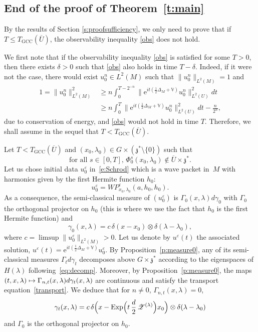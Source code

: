 \documentclass[JEP,XML,SOM,Unicode,published]{cedram}
\let\mathcal\mathscr
\newcommand\mto{\mathchoice{\longmapsto}{\mapsto}{\mapsto}{\mapsto}}
\newcommand{\rme}{\mathrm{e}}
\newcommand{\GCC}{\mathrm{GCC}}
\DeclareMathOperator{\Exp}{Exp}
\theoremstyle{plain}
\theoremstyle{definition}
\let\eps\varepsilon
\def\bbV{{\mathbb V}}
\begin{document}
\subsection{End of the proof of Theorem~\ref{t:main}} By the results of Section \ref{s:proofsufficiency}, we only need to prove that if $T\leq T_\GCC(\overline{U})$, the observability inequality \eqref{obs} does not hold.

We first note that if the observability inequality \eqref{obs} is satisfied for some $T>0$, then there exists $\delta>0$ such that \eqref{obs} also holds in time $T-\delta$. Indeed, if it were not the case, there would exist $u_0^n\in L^2(M)$ such that $\|u_0^n\|_{L^2(M)}=1$ and
\begin{align*}
1=\|u_0^n\|_{L^2(M)}^2&\geq n\int_0^{T-2^{-n}} \bigl\| \rme^{it(\frac12 \Delta_M+\bbV)} u_0^n\bigr\|^2_{L^2(U)} dt\\
&\geq n\int_0^{T} \bigl\| \rme^{it(\frac12 \Delta_M+\bbV)} u_0^n\bigr\|^2_{L^2(U)} dt-\frac{n}{2^n},
\end{align*}
due to conservation of energy, and \eqref{obs} would not hold in time $T$. Therefore, we shall assume in the sequel that $T<T_\GCC(\overline{U})$.

Let $T<T_\GCC(\overline{U})$ and $(x_0,\lambda_0)\in G\times (\mathfrak z^*\setminus\{0\})$ such that
\begin{equation}\label{e:hypfermee}
\text{for all $s\in [0,T]$, \ $\Phi_0^s(x_0,\lambda_0)\notin \overline{U}\times \mathfrak z^*$.}
\end{equation}
Let us chose initial data $u^\eps_0$ in~\eqref{e:Schrod} which is a wave packet in~$M$ with harmonics given by the first Hermite function $h_0$:
\[
u^\eps_0=WP^\eps_{x_0,\lambda_0}(a,h_0,h_0).
\]
As a consequence, the semi-classical measure of $(u^\eps_0)$ is $\Gamma_0(x,\lambda) d\gamma_0$ with $\Gamma_0$ the orthogonal projector on $h_0$ (this is where we use the fact that $h_0$ is the first Hermite function) and
\[
\gamma_0(x,\lambda)=c \, \delta(x-x_0)\otimes \delta(\lambda-\lambda_0),
\]
where $c=\limsup \| u^\eps_0\|_{L^2(M)}>0 $.
Let us denote by $u^\eps(t)$ the associated solution, $u^\eps(t)= \rme^{it(\frac12 \Delta_M+\bbV)} u^\eps_0$. By Proposition~\ref{p:measure0}, any of its semi-classical measures $\Gamma_t d\gamma_t$ decomposes above $G\times \mathfrak z^*$ according to the eigenspaces of $H(\lambda)$ following~\eqref{eq:decomp}.
Moreover, by Proposition~\ref{p:measure0},
the maps $(t,x,\lambda)\mto \Gamma_{n,t}(x,\lambda) d\gamma_t(x,\lambda)$ are continuous and satisfy the transport equation~\eqref{transport}.
We deduce that for $n\not=0$, $\Gamma_{n,t}(x,\lambda)=0$,
\begin{equation}\label{eq:gammat}
\gamma_t (x,\lambda)= c \, \delta\Bigl(x-\Exp \Bigl(t\,\frac d2\,\mathcal Z^{(\lambda)} \Bigr)x_0\Bigr)\otimes \delta(\lambda-\lambda_0)
\end{equation}
and $\Gamma_{0}$ is the orthogonal projector on $h_0$.
\end{document}
